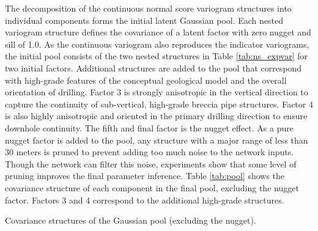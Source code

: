 The decomposition of the continuous normal score variogram structures into individual components forms the initial latent Gaussian pool. Each nested variogram structure defines the covariance of a latent factor with zero nugget and sill of 1.0. As the continuous variogram also reproduces the indicator variograms, the initial pool consists of the two nested structures in Table \ref{tab:ns_expvar} for two initial factors. Additional structures are added to the pool that correspond with high-grade features of the conceptual geological model and the overall orientation of drilling. Factor 3 is strongly anisotropic in the vertical direction to capture the continuity of sub-vertical, high-grade breccia pipe structures. Factor 4 is also highly anisotropic and oriented in the primary drilling direction to ensure downhole continuity. The fifth and final factor is the nugget effect. As a pure nugget factor is added to the pool, any structure with a major range of less than 30 meters is pruned to prevent adding too much noise to the network inputs. Though the network can filter this noise, experiments show that some level of pruning improves the final parameter inference. Table \ref{tab:pool} shows the covariance structure of each component in the final pool, excluding the nugget factor. Factors 3 and 4 correspond to the additional high-grade structures.



\begin{table}[!htb]
    \centering
    \caption{Covariance structures of the Gaussian pool (excluding the nugget).}
    \resizebox{0.9\width}{!}{}
    \label{tab:pool}
\end{table}

